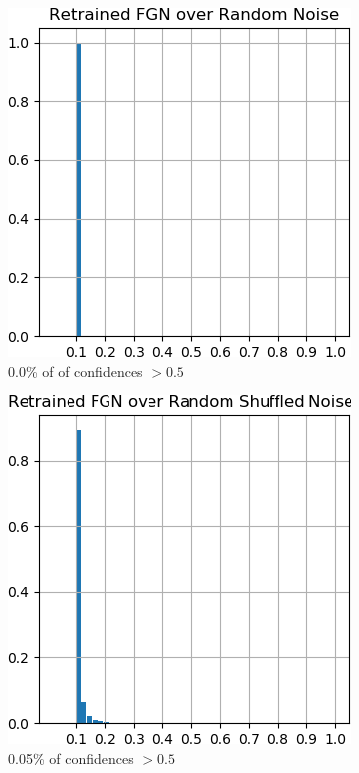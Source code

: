 \documentclass[12pt,oneside]{CUNY_PhD}
\begin{document}
\begin{figure}[!h]
    \centering
    \begin{subfigure}[t]{0.49\textwidth}
        \includegraphics[width=\textwidth]{images/mnist-behavior/retrained-hist-random.png}
        \caption*{0.0\% of of confidences $>0.5$}
    \end{subfigure}
    \begin{subfigure}[t]{0.49\textwidth}
        \includegraphics[width=\textwidth]{images/mnist-behavior/retrained-hist-shuffled-fixed.png}
        \caption*{0.05\% of confidences $>0.5$}
    \end{subfigure}
    \caption{}
    \label{fig:ret-hist}
\end{figure}
\newpage %
\end{document}
